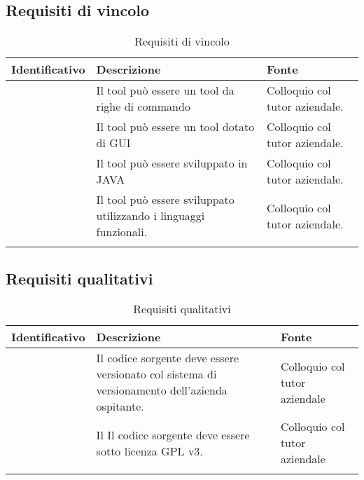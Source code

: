 \subsection{Requisiti di vincolo}\label{subsec:requisiti-vincolo}
\renewcommand{\arraystretch}{1.5}
\begin{center}
    \begin{longtable}{ | c| C{7cm} |C{3cm} |}
        \hline
        \textbf{Identificativo} & \textbf{Descrizione} &\textbf{Fonte}\\\hline
         &Il tool può essere un tool da righe di commando & Colloquio col tutor aziendale.\\\hline
         &Il tool può essere un tool dotato di GUI & Colloquio col tutor aziendale.\\\hline
         &Il tool può essere sviluppato in JAVA & Colloquio col tutor aziendale.\\\hline
         &Il tool può essere sviluppato utilizzando i linguaggi funzionali.& Colloquio col tutor aziendale.\\\hline
        \caption{Requisiti di vincolo}
    \end{longtable}
\end{center}
\setcounter{rowcount}{0}

\subsection{Requisiti qualitativi}\label{subsec:requisiti-qualitativi}
\renewcommand{\arraystretch}{1.5}
\begin{center}
    \begin{longtable}{ | c| C{7cm} |C{3cm} |}
        \hline
        \textbf{Identificativo} & \textbf{Descrizione} &\textbf{Fonte}\\\hline
        &Il codice sorgente deve essere versionato col sistema di versionamento dell'azienda ospitante. &Colloquio col tutor aziendale \\\hline
        &Il Il codice sorgente deve essere sotto licenza GPL v3.& Colloquio col tutor aziendale\\\hline
        \caption{Requisiti qualitativi}
    \end{longtable}
\end{center}
\setcounter{subCount}{0}
\setcounter{rowcount}{0}
